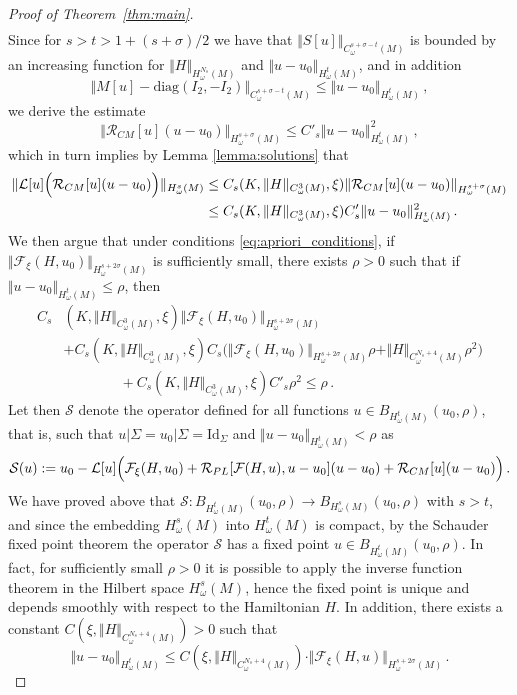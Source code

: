 \documentclass[11pt]{amsart}
\begin{document}
\begin{proof} [Proof of Theorem~\ref{thm:main}]
$$\begin{aligned}
\end{aligned}
$$
Since  for $s >t > 1+ (s+\sigma)/2$  we have that $ \Vert S[u] \Vert_{ C_\omega^{s+ \sigma-t}(M) }$  is bounded by an increasing function for $\Vert H \Vert_{ H^{N_s}_\omega(M)}$ and  $\Vert u-u_0 \Vert_{ H^t_\omega(M)}$,   and  in addition
$$
\Vert M[u] - \textrm{diag} (I_2, -I_2)  \Vert_{ C_\omega^{s+ \sigma-t}(M) } \leq \Vert u-u_0 \Vert_{ H^t_\omega(M)}\,,
$$
 we derive the estimate
$$
\Vert \mathcal R_{CM}[u] (u-u_0) \Vert_{ H^{s+ \sigma}_\omega(M)} \leq  C'_s \Vert u- u_0 \Vert^2_ { H^t_\omega(M)}  \,,
$$
which in turn implies by Lemma  \ref{lemma:solutions} that 
$$
\begin{aligned}
\Vert \mathcal{L}[u] \Bigl ( \mathcal R_{CM}[u] (u-u_0) \Big)\Vert_{H^s_\omega(M)}  & \leq C_s (K, \Vert H\Vert_{C^3_\omega(M)}, \xi) \Vert 
\mathcal R_{CM}[u] (u-u_0)\Vert_{H^{s+ \sigma}_\omega(M)} \\ & \leq C_s (K, \Vert H\Vert_{C^3_\omega(M)}, \xi)  C'_s \Vert u- u_0 \Vert^2_ { H^t_\omega(M)}\,.
\end{aligned}
$$
We then argue that under conditions \eqref{eq:apriori_conditions},  if  $\Vert  \mathcal{F}_\xi(H, u_0)  \Vert_{H^{s+2\sigma}_\omega(M)}$ is sufficiently small, there exists $\rho>0$ such that if $\Vert u- u_0 \Vert_ { H^t_\omega(M)} \leq \rho$, then
$$
\begin{aligned}
C_s &(K, \Vert H\Vert_{C^3_\omega(M)}, \xi)  \Vert  \mathcal{F}_\xi(H, u_0)  \Vert_{H^{s+2\sigma}_\omega(M)}   \\ &+  C_s (K, \Vert H\Vert_{C^3_\omega(M)}, \xi) C_s \Big( \Vert  \mathcal{F}_\xi(H, u_0)   \Vert_{H^{s+2\sigma}_\omega(M)}  \rho +  \Vert H \Vert_{C^{N_s+4}_\omega(M)} \rho^2\Big)  \\ & \qquad \qquad+ C_s (K, \Vert H\Vert_{C^3_\omega(M)}, \xi)  C'_s  \rho^2 \leq \rho\,.
\end{aligned}
$$
Let then $\mathcal  S$ denote the operator defined  for all functions $u\in B_{H^t_\omega(M)} (u_0, \rho)$, that is, such that $u \vert\Sigma = u_0 \vert \Sigma= \text{Id}_\Sigma$ 
and $\Vert u -u_0 \Vert_{H^t_\omega(M)} < \rho$ as
$$
\mathcal S(u) := u_0 - \mathcal{L}[u] \Bigl (\mathcal{F}_\xi(H, u_0) +  \mathcal R_{PL}[\mathcal F (H, u), u-u_0 ] (u-u_0) + \mathcal R_{CM}[u] (u-u_0)   \Big)\,.
$$
We have proved above that $\mathcal S: B_{H^t_\omega(M)} (u_0, \rho) \to B_{H^s_\omega(M)} (u_0, \rho)$ with $s>t$, and since the embedding 
$H^s_\omega(M)$ into $H^t_\omega(M)$ is compact, by the Schauder fixed point theorem the operator $\mathcal S$ has a fixed point $u \in B_{H^t_\omega(M)} (u_0, \rho)$.
In fact, for sufficiently small  $\rho>0$ it is possible to apply the inverse function theorem in the Hilbert space $H^s_\omega(M)$, hence the fixed point is unique
and depends smoothly with respect to the Hamiltonian $H$.  In addition, there exists a constant $C(\xi, \Vert H \Vert_{C^{N_s +4}_\omega(M)}) >0$ such that
$$
\Vert u- u_0 \Vert_{H^t_\omega(M)} \leq C(\xi, \Vert H \Vert_{C^{N_s +4}_\omega(M)}) \cdot \Vert \mathcal F_\xi (H, u)  \Vert_{H^{s+2\sigma}_\omega(M)} \,.
$$


\end{proof}
\end{document}
